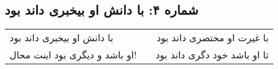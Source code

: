 \begin{center}
\section*{شماره ۴: با دانش او بیخبری داند بود}
\label{sec:004}
\begin{longtable}{l p{0.5cm} r}
با دانش او بیخبری داند بود
&&
با غیرت او مختصری داند بود
\\
او باشد و دیگری بود اینت محال!
&&
تا او باشد خود دگری داند بود
\\
\end{longtable}
\end{center}
